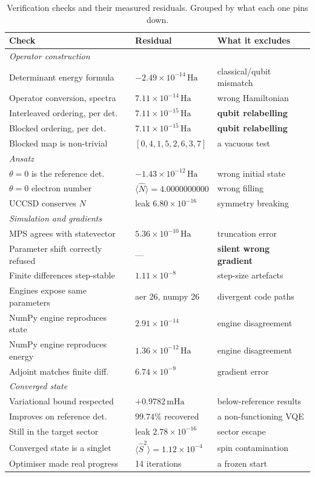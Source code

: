 \documentclass[11pt,a4paper]{article}
\newcommand{\mHa}{\ensuremath{\,\mathrm{mHa}}}
\newcommand{\Ha}{\ensuremath{\,\mathrm{Ha}}}
\newcommand{\Ssq}{\ensuremath{\langle \hat{S}^2 \rangle}}
\newcommand{\Nop}{\ensuremath{\langle \hat{N} \rangle}}
\begin{document}
\begin{table}[htbp]
\centering
\caption{Verification checks and their measured residuals. Grouped by what each
one pins down.}
\label{tab:checks}
\small
\begin{tabular}{lll}
\toprule
Check & Residual & What it excludes \\
\midrule
\multicolumn{3}{l}{\emph{Operator construction}}\\
Determinant energy formula      & $-2.49\times10^{-14}\Ha$ & classical/qubit mismatch \\
Operator conversion, spectra    & $7.11\times10^{-14}\Ha$  & wrong Hamiltonian \\
Interleaved ordering, per det.  & $7.11\times10^{-15}\Ha$  & \textbf{qubit relabelling} \\
Blocked ordering, per det.      & $7.11\times10^{-15}\Ha$  & \textbf{qubit relabelling} \\
Blocked map is non-trivial      & $[0,4,1,5,2,6,3,7]$      & a vacuous test \\
\midrule
\multicolumn{3}{l}{\emph{Ansatz}}\\
$\theta=0$ is the reference det.& $-1.43\times10^{-12}\Ha$ & wrong initial state \\
$\theta=0$ electron number      & $\Nop = 4.0000000000$    & wrong filling \\
UCCSD conserves $N$             & leak $6.80\times10^{-16}$& symmetry breaking \\
\midrule
\multicolumn{3}{l}{\emph{Simulation and gradients}}\\
MPS agrees with statevector     & $5.36\times10^{-10}\Ha$  & truncation error \\
Parameter shift correctly refused & ---                    & \textbf{silent wrong gradient} \\
Finite differences step-stable  & $1.11\times10^{-8}$      & step-size artefacts \\
Engines expose same parameters  & aer 26, numpy 26         & divergent code paths \\
NumPy engine reproduces state   & $2.91\times10^{-14}$     & engine disagreement \\
NumPy engine reproduces energy  & $1.36\times10^{-12}\Ha$  & engine disagreement \\
Adjoint matches finite diff.    & $6.74\times10^{-9}$      & gradient error \\
\midrule
\multicolumn{3}{l}{\emph{Converged state}}\\
Variational bound respected     & $+0.9782\mHa$            & below-reference results \\
Improves on reference det.      & $99.74\%$ recovered      & a non-functioning VQE \\
Still in the target sector      & leak $2.78\times10^{-16}$& sector escape \\
Converged state is a singlet    & $\Ssq = 1.12\times10^{-4}$& spin contamination \\
Optimiser made real progress    & 14 iterations            & a frozen start \\
\bottomrule
\end{tabular}
\end{table}
\end{document}
